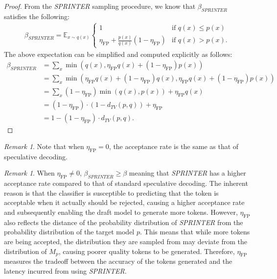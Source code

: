 \documentclass{article}
\theoremstyle{plain}
\newtheorem{corollary}[theorem]{Corollary}
\theoremstyle{definition}
\theoremstyle{remark}
\newtheorem{remark}[theorem]{Remark}
\begin{document}
\begin{proof}
From the \textit{SPRINTER} sampling procedure, we know that $\beta_{\textit{SPRINTER}}$ satisfies the following:
\begin{align}
    \beta_{\textit{SPRINTER}} = \mathbb{E}_{x\sim q(x)}
    \begin{cases} 
1 & \text{if } q(x) \leq p(x) \\
\eta_\text{FP}+\frac{p(x)}{q(x)} (1-\eta_\text{FP})& \text{if } q(x) > p(x).
\end{cases} 
\end{align}
The above expectation can be simplified and computed explicitly as follows:
\begin{align}
   \beta_{\textit{SPRINTER}} & = \sum_{x} \min(q(x), \eta_\text{FP} q(x) + (1-\eta_\text{FP})p(x))\nonumber\\
    &=\sum_{x} \min(\eta_\text{FP} q(x)+(1-\eta_\text{FP})q(x), \eta_\text{FP} q(x) + (1-\eta_\text{FP})p(x))\nonumber\\
    &=\sum_{x} (1-\eta_\text{FP})\min(q(x), p(x))+ \eta_\text{FP} q(x)\nonumber\\
    & = (1-\eta_\text{FP}) \cdot(1-d_{TV}(p,q)) + \eta_\text{FP}\nonumber\\
    &= 1-(1-\eta_\text{FP})\cdot d_{TV}(p,q).
\end{align}
\end{proof}
\begin{remark}
    Note that when $\eta_\text{FP} = 0$, the acceptance rate is the same as that of speculative decoding.
\end{remark}
\begin{remark}
    When $\eta_\text{FP} \neq 0$,  $\beta_{\textit{SPRINTER}} \geq \beta$ meaning that \textit{SPRINTER} has a higher acceptance rate compared to that of standard speculative decoding. The inherent reason is that the classifier is susceptible to predicting that the token is acceptable when it actually should be rejected, causing a higher acceptance rate and subsequently enabling the draft model to generate more tokens. However, $\eta_\text{FP}$ also reflects the distance of the probability distribution of \textit{SPRINTER} from the probability distribution of the target model $p$. This means that while more tokens are being accepted, the distribution they are sampled from may deviate from the distribution of $M_p$, causing poorer quality tokens to be generated. Therefore, $\eta_\text{FP}$ measures the tradeoff between the accuracy of the tokens generated and the latency incurred from using \textit{SPRINTER}.
\end{remark}
\end{document}
